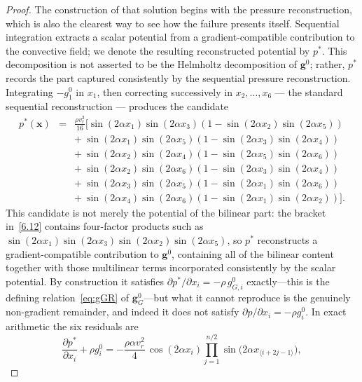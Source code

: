 \documentclass[11pt]{jfm}
\numberwithin{equation}{section}
\begin{document}
\begin{proof}
The construction of that solution begins with the pressure reconstruction, which is also the
clearest way to see how the failure presents itself. Sequential integration extracts a scalar potential from a gradient-compatible contribution to the convective field; we denote the resulting reconstructed potential by $p^{*}$. This decomposition is not asserted to be the Helmholtz decomposition of $\boldsymbol{g}^0$; rather, $p^{*}$ records the part captured consistently by the sequential pressure reconstruction. Integrating $-g_1^0$ in $x_1$, then correcting successively
in $x_2,\dots,x_6$ --- the standard sequential reconstruction --- produces the candidate
\begin{eqnarray}
\label{6.12}
p^{*}(\boldsymbol{x}) &=& \tfrac{\rho v_r^2}{16}\Big[
\sin(2\alpha x_1)\sin(2\alpha x_3)\left(1-\sin(2\alpha x_2)\sin(2\alpha x_5)\right)\nonumber\\
&&+\ \sin(2\alpha x_1)\sin(2\alpha x_5)\left(1-\sin(2\alpha x_3)\sin(2\alpha x_4)\right)\nonumber\\
&&+\ \sin(2\alpha x_2)\sin(2\alpha x_4)\left(1-\sin(2\alpha x_5)\sin(2\alpha x_6)\right)\nonumber\\
&&+\ \sin(2\alpha x_2)\sin(2\alpha x_6)\left(1-\sin(2\alpha x_3)\sin(2\alpha x_4)\right)\nonumber\\
&&+\ \sin(2\alpha x_3)\sin(2\alpha x_5)\left(1-\sin(2\alpha x_1)\sin(2\alpha x_6)\right)\nonumber\\
&&+\ \sin(2\alpha x_4)\sin(2\alpha x_6)\left(1-\sin(2\alpha x_1)\sin(2\alpha x_2)\right)\Big].
\end{eqnarray}
This candidate is not merely the potential of the bilinear part: the bracket in~\eqref{6.12}
contains four-factor products such as $\sin(2\alpha x_1)\sin(2\alpha x_3)\sin(2\alpha x_2)\sin(2\alpha x_5)$,
so $p^{*}$ reconstructs a gradient-compatible contribution to $\boldsymbol{g}^0$, containing all of the
bilinear content together with those multilinear terms incorporated consistently by the scalar
potential. By construction it satisfies $\partial p^{*}/\partial x_i=-\rho\,g^{0}_{G,i}$
exactly---this is the defining relation~\eqref{eq:gGR} of $\boldsymbol{g}^{0}_{G}$---but what it
cannot reproduce is the genuinely non-gradient remainder, and indeed it does not
satisfy $\partial p/\partial x_i=-\rho g_i^0$. In exact arithmetic the six residuals are
\begin{equation}
\label{6.13}
\frac{\partial p^{*}}{\partial x_i}+\rho g_i^0
= -\frac{\rho\alpha v_r^2}{4}\,\cos(2\alpha x_i)
\prod_{j=1}^{n/2}\sin\!\bigl(2\alpha x_{\langle i+2j-1\rangle}\bigr),

\end{equation}
\end{proof}
\end{document}
